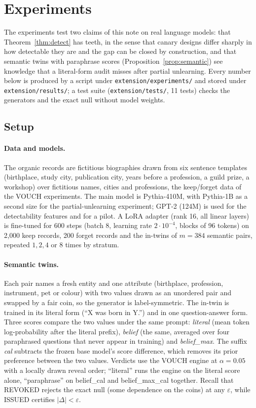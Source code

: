 \documentclass[11pt]{article}
\theoremstyle{definition}
\theoremstyle{remark}
\newcommand{\eps}{\varepsilon}
\begin{document}
\section{Experiments}\label{sec:experiments}

The experiments test two claims of this note on real language models: that
Theorem~\ref{thm:detect} has teeth, in the sense that canary designs differ sharply in
how detectable they are and the gap can be closed by construction, and that semantic
twins with paraphrase scores (Proposition~\ref{prop:semantic}) see knowledge that a
literal-form audit misses after partial unlearning. Every number below is produced
by a script under \texttt{extension/experiments/} and stored under
\texttt{extension/results/}; a test suite (\texttt{extension/tests/}, 11 tests)
checks the generators and the exact null without model weights.

\subsection{Setup}

\paragraph{Data and models.} The organic records are fictitious biographies drawn
from six sentence templates (birthplace, study city, publication city, years before a
profession, a guild prize, a workshop) over fictitious names, cities and professions,
the keep/forget data of the VOUCH experiments. The main model is Pythia-410M, with
Pythia-1B as a second size for the partial-unlearning experiment; GPT-2
(124M) is used for the detectability features and for a pilot. A LoRA adapter (rank
16, all linear layers) is fine-tuned for 600 steps (batch 8, learning rate
$2\cdot10^{-4}$, blocks of 96 tokens) on 2{,}000 keep records, 200 forget records and
the in-twins of $m=384$ semantic pairs, repeated $1,2,4$ or $8$ times by stratum.

\paragraph{Semantic twins.} Each pair names a fresh entity and one attribute
(birthplace, profession, instrument, pet or colour) with two values drawn as an
unordered pair and swapped by a fair coin, so the generator is label-symmetric. The
in-twin is trained in its literal form (``X was born in Y.'') and in one
question-answer form. Three scores compare the two values under the same prompt:
\emph{literal} (mean token log-probability after the literal prefix), \emph{belief}
(the same, averaged over four paraphrased questions that never appear in training)
and \emph{belief\_max}. The suffix \emph{cal} subtracts the frozen base model's score
difference, which removes its prior preference between the two values. Verdicts use
the VOUCH engine at $\alpha=0.05$ with a locally drawn reveal order; ``literal'' runs
the engine on the literal score alone, ``paraphrase'' on belief\_cal and
belief\_max\_cal together. Recall that REVOKED rejects the exact null (some dependence
on the coins) at any $\eps$, while ISSUED certifies $|\Delta|<\eps$.
\end{document}
